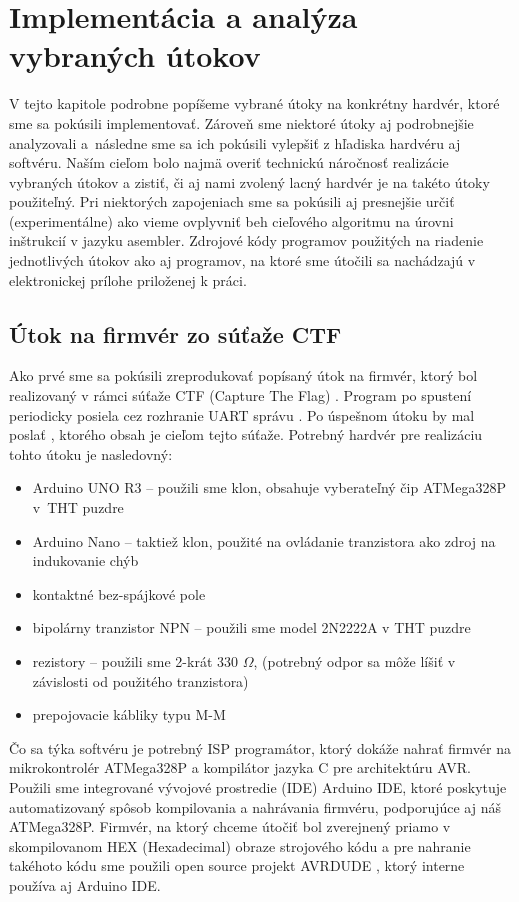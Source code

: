\chapter{Implementácia a analýza vybraných útokov}
\label{kap:utoky}

V tejto kapitole podrobne popíšeme vybrané útoky na konkrétny hardvér, ktoré sme sa pokúsili implementovať. Zároveň sme niektoré útoky aj podrobnejšie analyzovali a~následne sme sa ich pokúsili vylepšiť z hľadiska hardvéru aj softvéru. Naším cieľom bolo najmä overiť technickú náročnosť realizácie vybraných útokov a zistiť, či aj nami zvolený lacný hardvér je na takéto útoky použiteľný. Pri niektorých zapojeniach sme sa pokúsili aj presnejšie určiť (experimentálne) ako vieme ovplyvniť beh cieľového algoritmu na úrovni inštrukcií v jazyku asembler. Zdrojové kódy programov použitých na riadenie jednotlivých útokov ako aj programov, na ktoré sme útočili sa nachádzajú v elektronickej prílohe priloženej k práci.

\section{Útok na firmvér zo súťaže CTF} \label{kap3:sek:utokNaFirmverCTF}
Ako prvé sme sa pokúsili zreprodukovať popísaný útok na firmvér, ktorý bol realizovaný v rámci súťaže CTF (Capture The Flag) \cite{vccOnTheCheap}. Program po spustení periodicky posiela cez rozhranie UART správu . Po úspešnom útoku by mal poslať , ktorého obsah je cieľom tejto súťaže. Potrebný hardvér pre realizáciu tohto útoku je nasledovný:
\begin{itemize}
    \item Arduino UNO R3 -- použili sme klon, obsahuje vyberateľný čip ATMega328P v~THT puzdre
    \item Arduino Nano -- taktiež klon, použité na ovládanie tranzistora ako zdroj na indukovanie chýb
    \item kontaktné bez-spájkové pole
    \item bipolárny tranzistor NPN -- použili sme model 2N2222A v THT puzdre
    \item rezistory -- použili sme 2-krát 330 $\Omega$, (potrebný odpor sa môže líšiť v závislosti od použitého tranzistora)
    \item prepojovacie kábliky typu M-M
\end{itemize}
Čo sa týka softvéru je potrebný ISP programátor, ktorý dokáže nahrať firmvér na mikrokontrolér ATMega328P a kompilátor jazyka C pre architektúru AVR. Použili sme integrované vývojové prostredie (IDE) Arduino IDE, ktoré poskytuje automatizovaný spôsob kompilovania a nahrávania firmvéru, podporujúce aj náš ATMega328P. Firmvér, na ktorý chceme útočiť bol zverejnený priamo v skompilovanom HEX (Hexadecimal) obraze strojového kódu a pre nahranie takéhoto kódu sme použili open source projekt AVRDUDE \cite{avrdude}, ktorý interne používa aj Arduino IDE.


